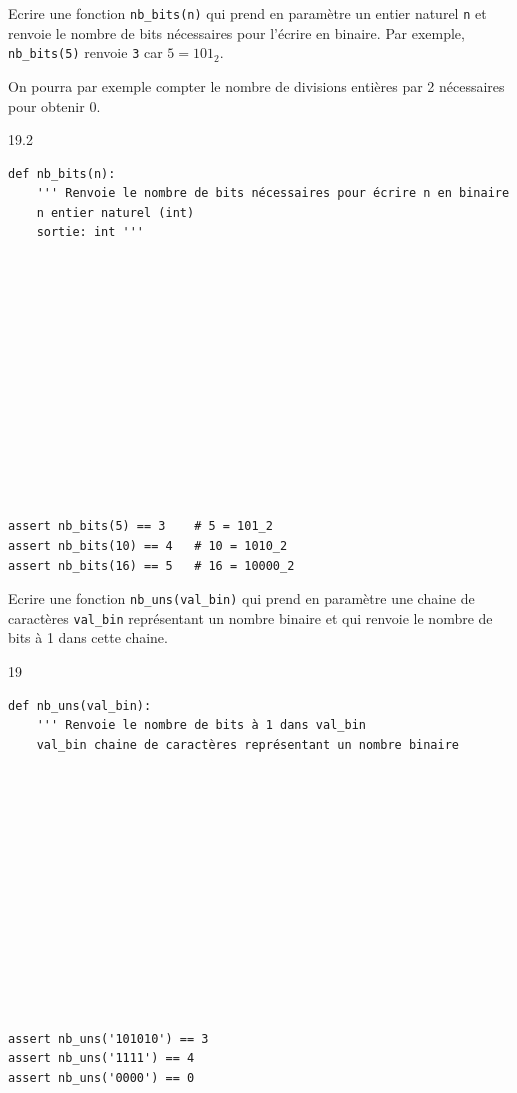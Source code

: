\documentclass[a4paper,10pt]{report}
\def\ptsexoI{2}
\def\ptsexoJ{2}
\def\ptsexoK{1}
\begin{document}
\medskip

\exods{\ptsexoI}

Ecrire une fonction \verb|nb_bits(n)| qui prend en paramètre un entier naturel \verb|n| et renvoie le nombre de bits nécessaires pour l'écrire en binaire. Par exemple, \verb|nb_bits(5)| renvoie \verb|3| car $5 = 101_2$.

On pourra par exemple compter le nombre de divisions entières par 2 nécessaires pour obtenir 0.
    \begin{answer}{1}{9.2} 
\begin{verbatim}
def nb_bits(n):
    ''' Renvoie le nombre de bits nécessaires pour écrire n en binaire 
    n entier naturel (int)
    sortie: int '''














assert nb_bits(5) == 3    # 5 = 101_2
assert nb_bits(10) == 4   # 10 = 1010_2 
assert nb_bits(16) == 5   # 16 = 10000_2
    \end{verbatim}

    \end{answer}

    \pagebreak

    \exods{\ptsexoJ}

Ecrire une fonction \verb|nb_uns(val_bin)| qui prend en paramètre une chaine de caractères \verb|val_bin| représentant un nombre binaire et qui renvoie le nombre de bits à 1 dans cette chaine.

    \begin{answer}{1}{9}
\begin{verbatim}
def nb_uns(val_bin):
    ''' Renvoie le nombre de bits à 1 dans val_bin
    val_bin chaine de caractères représentant un nombre binaire
    













assert nb_uns('101010') == 3
assert nb_uns('1111') == 4
assert nb_uns('0000') == 0
    \end{verbatim}

    \end{answer}

    \medskip

     \exods{\ptsexoK}
\end{document}
